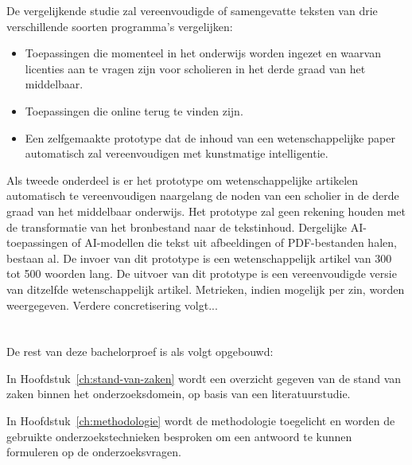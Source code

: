 De vergelijkende studie zal vereenvoudigde of samengevatte teksten van drie verschillende soorten programma's vergelijken:
\begin{itemize}
	\item Toepassingen die momenteel in het onderwijs worden ingezet en waarvan licenties aan te vragen zijn voor scholieren in het derde graad van het middelbaar.
	\item Toepassingen die online terug te vinden zijn.
	\item Een zelfgemaakte prototype dat de inhoud van een wetenschappelijke paper automatisch zal vereenvoudigen met kunstmatige intelligentie.
\end{itemize}

Als tweede onderdeel is er het prototype om wetenschappelijke artikelen automatisch te vereenvoudigen naargelang de noden van een scholier in de derde graad van het middelbaar onderwijs. Het prototype zal geen rekening houden met de transformatie van het bronbestand naar de tekstinhoud. Dergelijke AI-toepassingen of AI-modellen die tekst uit afbeeldingen of PDF-bestanden halen, bestaan al. De invoer van dit prototype is een wetenschappelijk artikel van 300 tot 500 woorden lang. De uitvoer van dit prototype is een vereenvoudigde versie van ditzelfde wetenschappelijk artikel. Metrieken, indien mogelijk per zin, worden weergegeven. Verdere concretisering volgt...

\section{}%
\label{sec:opzet-bachelorproef}


De rest van deze bachelorproef is als volgt opgebouwd:

In Hoofdstuk~\ref{ch:stand-van-zaken} wordt een overzicht gegeven van de stand van zaken binnen het onderzoeksdomein, op basis van een literatuurstudie.

In Hoofdstuk~\ref{ch:methodologie} wordt de methodologie toegelicht en worden de gebruikte onderzoekstechnieken besproken om een antwoord te kunnen formuleren op de onderzoeksvragen.


